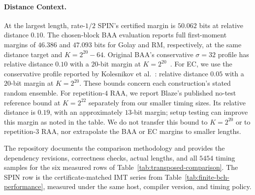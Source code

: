 \paragraph{Distance Context.}
At the largest length, rate-$1/2$ SPIN's certified margin is $50.062$ bits at
relative distance $0.10$. The chosen-block BAA evaluation reports full
first-moment margins of $46.386$ and $47.093$ bits for Golay and RM,
respectively, at the same distance target and $K=2^{20}-64$.
Original BAA's conservative $\sigma=32$ profile has relative distance
$0.10$ with a $20$-bit margin at $K=2^{20}$~\cite[Fig.~10]{KolesnikovEtAl2026BA}.
For EC, we use the conservative profile reported by Kolesnikov
et al.~\cite{KolesnikovEtAl2026BA}: relative distance $0.05$ with
a $20$-bit margin at $K=2^{20}$. These bounds concern each construction's
stated random ensemble. For repetition-$4$ RAA, we report Blaze's
published no-test reference bound at $K=2^{22}$ separately from our
smaller timing sizes. Its relative distance is $0.19$, with an approximately
$13$-bit margin; setup testing can improve this margin as noted in the table.
We do not transfer this bound to $K=2^{20}$ or to repetition-$3$ RAA,
nor extrapolate the BAA or EC margins to smaller lengths.



The repository documents the comparison methodology and provides the
dependency revisions, correctness checks, actual lengths, and all $5454$
timing samples for the six measured rows of
Table~\ref{tab:transposed-comparison}\repositorycite. The SPIN row is the
certificate-matched IMT series from Table~\ref{tab:finite-bch-performance},
measured under the same host, compiler version, and timing policy.
\FloatBarrier
